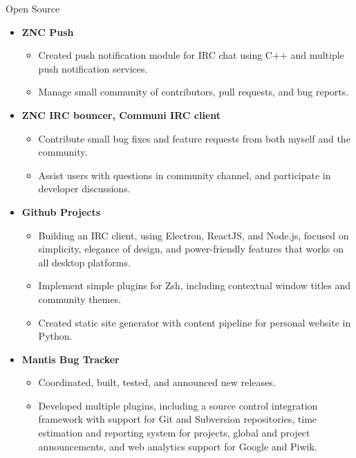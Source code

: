 \documentclass[11pt,oneside]{article}
\newenvironment{ressection}[1]{
    \vspace{8pt}
    {\fontfamily{phv}\selectfont\Large#1}
    \begin{itemize}
    \vspace{3pt}
}{
    \end{itemize}
}
\newcommand{\resitem}[1]{
    \vspace{-4pt}
    \item \begin{flushleft} #1 \end{flushleft}
}
\newcommand{\ressubitem}[1]{
    \vspace{-1pt}
    \item \begin{flushleft} #1 \end{flushleft}
}
\newenvironment{reslist}[1]{
    \resitem{\textbf{#1}}
    \vspace{-2pt}
    \begin{itemize}
}{
    \end{itemize}
}
\begin{document}
\begin{ressection}{Open Source}

    \begin{reslist}{ZNC Push}
        \ressubitem{Created push notification module for IRC chat using C++ and multiple push notification services.}
        \ressubitem{Manage small community of contributors, pull requests, and bug reports.}
    \end{reslist}

    \begin{reslist}{ZNC IRC bouncer, Communi IRC client}
        \ressubitem{Contribute small bug fixes and feature requests from both myself and the community.}
        \ressubitem{Assist users with questions in community channel, and participate in developer discussions.}
    \end{reslist}

    \begin{reslist}{Github Projects}
        \ressubitem{Building an IRC client, using Electron, ReactJS, and Node.js, focused on simplicity, elegance
            of design, and power-friendly features that works on all desktop platforms.}
        \ressubitem{Implement simple plugins for Zsh, including contextual window titles and community themes.}
        \ressubitem{Created static site generator with content pipeline for personal website in Python.}
    \end{reslist}

    \begin{reslist}{Mantis Bug Tracker}
        \ressubitem{Coordinated, built, tested, and announced new releases.}
        \ressubitem{Developed multiple plugins, including a source control integration framework
        with support for Git and Subversion repositories, time estimation and reporting system for projects,
        global and project announcements, and web analytics support for Google and Piwik.}
    \end{reslist}



\end{ressection}
\end{document}
